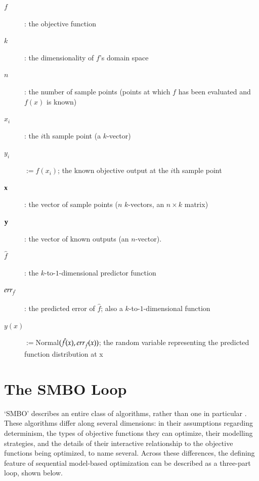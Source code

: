 \begin{minipage}{\textwidth}
\begin{framed}
\begin{description}
  \item[$f$]: the objective function
  \item[$k$]: the dimensionality of $f$'s domain space
  \item[$n$]: the number of sample points (points at which $f$ has been evaluated and $f(x)$ is known)
  \item[$x_i$]: the $i$th sample point (a $k$-vector)
  \item[$y_i$]$:= f(x_i)$; the known objective output at the $i$th sample point
  \item[$\mathbf{x}$]: the vector of sample points ($n$ $k$-vectors, an $n\times k$ matrix)
  \item[$\mathbf{y}$]: the vector of known outputs (an $n$-vector).
  \item[$\hat{f}$]: the $k$-to-$1$-dimensional predictor function
  \item[$err_{\hat{f}}$]: the predicted error of $\hat{f}$; also a $k$-to-$1$-dimensional function
  \item[$y(x)$]$:=$Normal$(\hat{f}(x),err_{\hat{f}}(x))$; the random variable representing the predicted function distribution at x
\end{description}

\end{framed}
\label{fig:notation}
\end{minipage}

\section{The SMBO Loop}

`SMBO' describes an entire class of algorithms, rather than one in particular \cite{hutter_sequential_2011, hamadi_autonomous_2012, jones_efficient_1998, rasmussen_gaussian_2006}. %
These algorithms differ along several dimensions: in their assumptions regarding determinism, the types of objective functions they can optimize, their modelling strategies, and the details of their interactive relationship to the objective functions being optimized, to name several. %
Across these differences, the defining feature of sequential model-based optimization can be described as a three-part loop, shown below.

